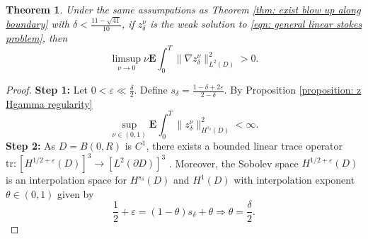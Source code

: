 \documentclass[11pt, reqno]{article}
\newtheorem{theorem}{Theorem}[section]
\def\grad{\nabla}
\def\E{\mathbf{E}}
\begin{document}
\begin{theorem}\label{thm: exist anomalous dissipation}
    Under the same assumpations as Theorem \ref{thm: exist blow up along boundary} with $\delta < \frac{11 - \sqrt{41}}{10}$, if $z_{\delta}^\nu$ is the weak solution to \eqref{eqn: general linear stokes problem}, then 
    \[
        \limsup_{\nu \to 0}\nu\E\int_0^T\|\grad z_{\delta}^\nu\|_{L^2(D)}^2 > 0.
    \]
\end{theorem}
\begin{proof}
    \textbf{Step 1:} Let $0 < \varepsilon \ll \frac{\delta}{2}$. Define $s_\delta = \frac{1-\delta + 2\varepsilon}{2-\delta}$. By Proposition \ref{proposition: z Hgamma regularity}
    \[
        \sup_{\nu \in (0,1)}\E\int_0^T\|z_{\delta}^\nu\|_{H^{s_\delta}(D)}^2 < \infty.
    \]
    \textbf{Step 2:} As $D = B(0,R)$ is $C^1$, there exists a bounded linear trace operator $\mathrm{tr}: [H^{1/2 + \varepsilon}(D)]^3 \to [L^2(\partial D)]^3$ \cites{schneider2011traces, adams2003sobolev}. Moreover, the Sobolev space $H^{1/2 + \varepsilon}(D)$ is an interpolation space for $H^{s_\delta}(D)$ and $H^1(D)$ 
    with interpolation exponent $\theta \in (0,1)$ given by  \cites{adams2003sobolev, triebel1973spaces}
    \[
        \frac{1}{2} + \varepsilon = (1-\theta)s_\delta + \theta \Rightarrow \theta = \frac{\delta}{2}.
    \]
    

\end{proof}
\end{document}
